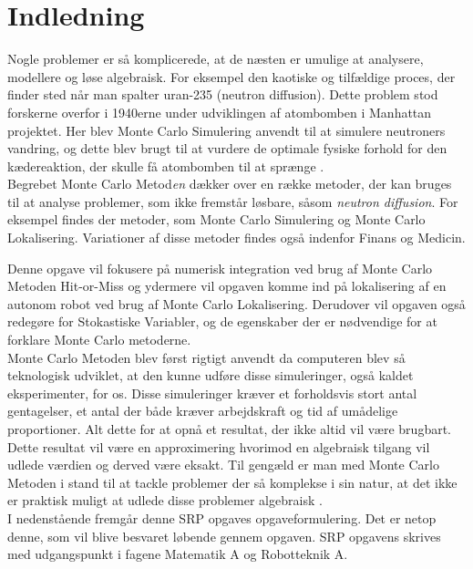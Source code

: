 \documentclass[../../SRP.tex]{subfiles}
\begin{document}
\chapter{Indledning}

Nogle problemer er så komplicerede, at de næsten er umulige at analysere, modellere og løse algebraisk. For eksempel den kaotiske og tilfældige proces, der finder sted når man spalter uran-235 (neutron diffusion). Dette problem stod forskerne overfor i 1940erne under udviklingen af atombomben i Manhattan projektet. Her blev Monte Carlo Simulering anvendt til at simulere neutroners vandring, og dette blev brugt til at vurdere de optimale fysiske forhold for den kædereaktion, der skulle få atombomben til at sprænge \cite{AHF}. \\

Begrebet Monte Carlo Metod\textit{en} dækker over en række metoder, der kan bruges til at analyse problemer, som ikke fremstår løsbare, såsom \textit{neutron diffusion}. For eksempel findes der metoder, som Monte Carlo Simulering og Monte Carlo Lokalisering. Variationer af disse metoder findes også indenfor Finans og Medicin. 

Denne opgave vil fokusere på numerisk integration ved brug af Monte Carlo Metoden Hit-or-Miss og ydermere vil opgaven komme ind på lokalisering af en autonom robot ved brug af Monte Carlo Lokalisering. Derudover vil opgaven også redegøre for Stokastiske Variabler, og de egenskaber der er nødvendige for at forklare Monte Carlo metoderne. \\

Monte Carlo Metoden blev først rigtigt anvendt da computeren blev så teknologisk udviklet, at den kunne udføre disse simuleringer, også kaldet eksperimenter, for os. Disse simuleringer kræver et forholdsvis stort antal gentagelser, et antal der både kræver arbejdskraft og tid af umådelige proportioner. Alt dette for at opnå et resultat, der ikke altid vil være brugbart. Dette resultat vil være en approximering hvorimod en algebraisk tilgang vil udlede værdien og derved være eksakt. Til gengæld er man med Monte Carlo Metoden i stand til at tackle problemer der så komplekse i sin natur, at det ikke er praktisk muligt at udlede disse problemer algebraisk \cite{SBM}. \\

I nedenstående fremgår denne SRP opgaves opgaveformulering. Det er netop denne, som vil blive besvaret løbende gennem opgaven. SRP opgavens skrives med udgangspunkt i fagene Matematik A og Robotteknik A. \\
\end{document}
